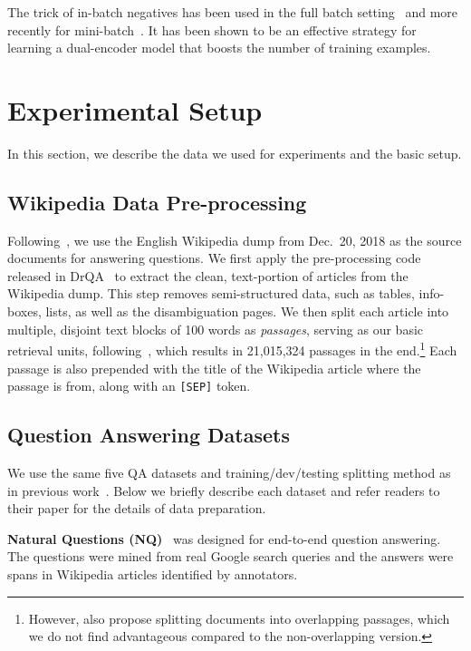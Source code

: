 \documentclass[11pt,a4paper]{article}
\newcommand\ttt[1]{\texttt{#1}}
\begin{document}
The trick of in-batch negatives has been used in the full batch setting~\cite{yih2011learning} and more recently
for mini-batch~\cite{henderson2017efficient,gillick-etal-2019-learning}.
It has been shown to be an effective strategy for learning a dual-encoder model that boosts the number of training examples.
 
\section{Experimental Setup}
\label{sec:exp-setup}

In this section, we describe the data we used for experiments and the basic setup.


\subsection{Wikipedia Data Pre-processing}
\label{sec:wiki-preprocessing}

Following~\cite{lee2019latent}, we use the English Wikipedia dump from Dec.~20, 2018 as the source documents for answering questions.
We first apply the pre-processing code released in DrQA~\cite{chen2017reading} to extract the clean, text-portion of articles from the Wikipedia dump.
This step removes semi-structured data, such as tables, info-boxes, lists, as well as the disambiguation pages.
We then split each article into multiple, disjoint text blocks of 100 words as \emph{passages}, serving as our basic retrieval units, following~\cite{wang2019multi}, which results in 21,015,324 passages in the end.\footnote{However, \citet{wang2019multi} also propose splitting documents into overlapping passages, which we do not find advantageous compared to the non-overlapping version.}
Each passage is also prepended with the title of the Wikipedia article where the passage is from, along with an \ttt{[SEP]} token.


\subsection{Question Answering Datasets}
\label{sec:qa-datasets}

We use the same five QA datasets and training/dev/testing splitting method as in previous work~\cite{lee2019latent}.
Below we briefly describe each dataset and refer readers to their paper for the details of data preparation.

\noindent
\textbf{Natural Questions (NQ)}~\cite{kwiatkowski2019natural} was designed for end-to-end question answering.
The questions were mined from real Google search queries and the answers were spans in Wikipedia articles identified by annotators.
\end{document}
